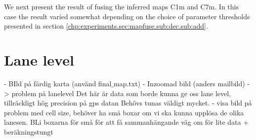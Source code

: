 We next present the result of fusing the inferred maps C1m and C7m. In this case the result varied somewhat depending on the choice of parameter thresholds presented in section \ref{chp:experiments.sec:mapfuse.sub:dec.sub:add}.





\section{Lane level}

- BIld på färdig karta (använd final$\_$map.txt)
- Inzoomad bild (anders mailbild) -> problem på lanelevel
Det här är data som borde kunna ge oss lane level, tillräckligt hög precision på gps datan
Behövs tunas väldigt mycket. 
- visa bild på problem med cell size, behöver ha små boxar om vi ska kunna upplösa de olika lanesen. BLi boxarna för små för att få sammanhängande väg om för lite data + beräkningstungt